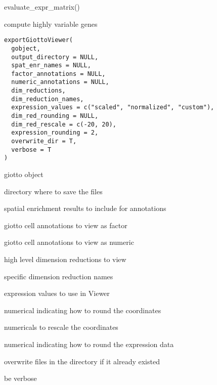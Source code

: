 \documentclass[a4paper]{book}
\begin{document}
%
\begin{Examples}
\begin{ExampleCode}
    evaluate_expr_matrix()
\end{ExampleCode}
\end{Examples}
%
\begin{Description}\relax
compute highly variable genes
\end{Description}
%
\begin{Usage}
\begin{verbatim}
exportGiottoViewer(
  gobject,
  output_directory = NULL,
  spat_enr_names = NULL,
  factor_annotations = NULL,
  numeric_annotations = NULL,
  dim_reductions,
  dim_reduction_names,
  expression_values = c("scaled", "normalized", "custom"),
  dim_red_rounding = NULL,
  dim_red_rescale = c(-20, 20),
  expression_rounding = 2,
  overwrite_dir = T,
  verbose = T
)
\end{verbatim}
\end{Usage}
%
\begin{Arguments}
\begin{ldescription}
\item[\code{gobject}] giotto object

\item[\code{output\_directory}] directory where to save the files

\item[\code{spat\_enr\_names}] spatial enrichment results to include for annotations

\item[\code{factor\_annotations}] giotto cell annotations to view as factor

\item[\code{numeric\_annotations}] giotto cell annotations to view as numeric

\item[\code{dim\_reductions}] high level dimension reductions to view

\item[\code{dim\_reduction\_names}] specific dimension reduction names

\item[\code{expression\_values}] expression values to use in Viewer

\item[\code{dim\_red\_rounding}] numerical indicating how to round the coordinates

\item[\code{dim\_red\_rescale}] numericals to rescale the coordinates

\item[\code{expression\_rounding}] numerical indicating how to round the expression data

\item[\code{overwrite\_dir}] overwrite files in the directory if it already existed

\item[\code{verbose}] be verbose
\end{ldescription}
\end{Arguments}
\end{document}
